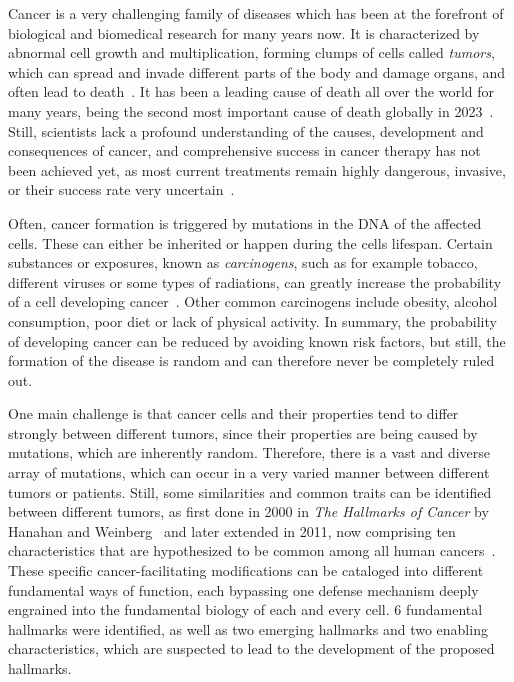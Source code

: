 Cancer is a very challenging family of diseases which has been at the forefront of biological and biomedical research for many years now. It is characterized by abnormal cell growth and multiplication, forming clumps of cells called \textit{tumors}, which can spread and invade different parts of the body and damage organs, and often lead to death~\cite{who-cancer}. It has been a leading cause of death all over the world for many years, being the second most important cause of death globally in 2023~\cite{owid-causes-of-death}. Still, scientists lack a profound understanding of the causes, development and consequences of cancer, and comprehensive success in cancer therapy has not been achieved yet, as most current treatments remain highly dangerous, invasive, or their success rate very uncertain~\cite{side-effects-cancer-treatments, narrative-review-heterogeneity-challenges}.

Often, cancer formation is triggered by mutations in the DNA of the affected cells. These can either be inherited or happen during the cells lifespan. Certain substances or exposures, known as \textit{carcinogens}, such as for example tobacco, different viruses or some types of radiations, can greatly increase the probability of a cell developing cancer~\cite{carcinogens}. Other common carcinogens include obesity, alcohol consumption, poor diet or lack of physical activity. In summary, the probability of developing cancer can be reduced by avoiding known risk factors, but still, the formation of the disease is random and can therefore never be completely ruled out.

One main challenge is that cancer cells and their properties tend to differ strongly between different tumors, since their properties are being caused by mutations, which are inherently random. Therefore, there is a vast and diverse array of mutations, which can occur in a very varied manner between different tumors or patients. Still, some similarities and common traits can be identified between different tumors, as first done in 2000 in \textit{The Hallmarks of Cancer} by Hanahan and Weinberg~\cite{hallmarks-of-cancer} and later extended in 2011, now comprising ten characteristics that are hypothesized to be common among all human cancers~\cite{hallmarks-of-cancer-next-generation}.\\
These specific cancer-facilitating modifications can be cataloged into different fundamental ways of function, each bypassing one defense mechanism deeply engrained into the fundamental biology of each and every cell. 6 fundamental hallmarks were identified, as well as two emerging hallmarks and two enabling characteristics, which are suspected to lead to the development of the proposed hallmarks.

